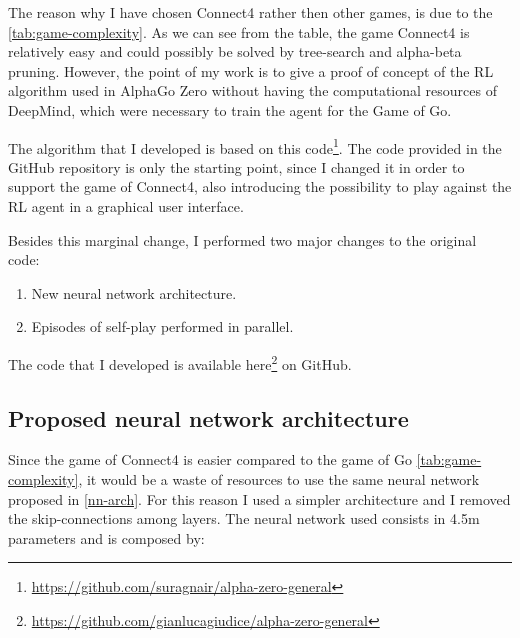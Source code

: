 \documentclass{article}
\begin{document}
The reason why I have chosen Connect4 rather then other games, is due to the \autoref{tab:game-complexity}. As we can see from the table, the game Connect4 is relatively easy and could possibly be solved by tree-search and alpha-beta pruning. However, the point of my work is to give a proof of concept of the RL algorithm used in AlphaGo Zero without having the computational resources of DeepMind, which were necessary to train the agent for the Game of Go.

The algorithm that I developed is based on this code\footnote{\url{https://github.com/suragnair/alpha-zero-general}}. The code provided in the GitHub repository is only the starting point, since I changed it in order to support the game of Connect4, also introducing the possibility to play against the RL agent in a graphical user interface.

Besides this marginal change, I performed two major changes to the original code:
\begin{enumerate}
\item New neural network architecture.
\item Episodes of self-play performed in parallel.
\end{enumerate}

The code that I developed is available here\footnote{\url{https://github.com/gianlucagiudice/alpha-zero-general}} on GitHub.

\subsection{Proposed neural network architecture}
Since the game of Connect4 is easier compared to the game of Go \autoref{tab:game-complexity}, it would be a waste of resources to use the same neural network proposed in \autoref{nn-arch}. For this reason I used a simpler architecture and I removed the skip-connections among layers. The neural network used consists in 4.5m parameters and is composed by:
\end{document}
